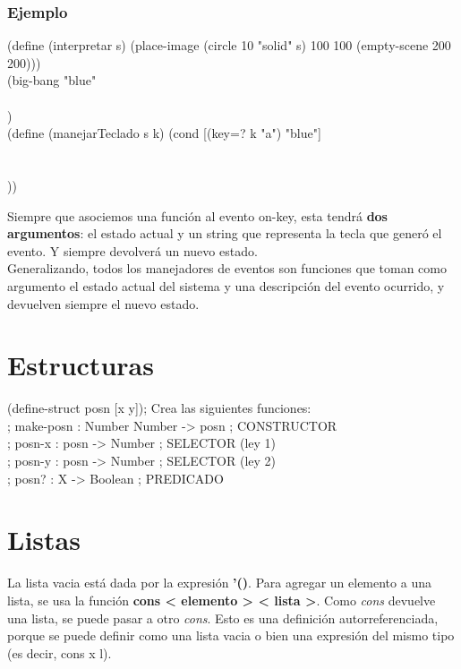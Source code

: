 \documentclass[11pt,a4paper]{article}
\begin{document}
\subsubsection{Ejemplo}
\begin{siderules}
(define (interpretar s) (place-image (circle 10 "solid" s) 100 100 (empty-scene 200 200)))\\

\noindent (big-bang "blue"\\
\indent \indent {}\\
\indent \indent {})\\

\noindent (define (manejarTeclado s k) (cond [(key=? k "a") "blue"]\\
\indent \indent \indent \indent \indent \indent \indent \indent \indent \indent [(key=? k "r") "red"]\\
\indent \indent \indent \indent \indent \indent \indent \indent \indent \indent [(key=? k "v") "green"]\\
\indent \indent \indent \indent \indent \indent \indent \indent \indent \indent [else s]))
\end{siderules}

Siempre que asociemos una función al evento on-key, esta tendrá \textbf{dos argumentos}: el estado actual y un string que representa la tecla que generó el evento. Y siempre devolverá un nuevo estado. \\
\indent Generalizando, todos los manejadores de eventos son funciones que toman como argumento el estado actual del sistema y una descripción del evento ocurrido, y devuelven siempre el nuevo estado.

\section{Estructuras}
\begin{siderules}
(define-struct posn [x y]); Crea las siguientes funciones:\\
; make-posn : Number Number -> posn ; CONSTRUCTOR\\
; posn-x : posn -> Number ; SELECTOR (ley 1)\\
; posn-y : posn -> Number ; SELECTOR (ley 2)\\
; posn? : X -> Boolean ; PREDICADO
\end{siderules}

\section{Listas}
La lista vacia est\'a dada por la expresi\'on \textbf{'()}. Para agregar un elemento a una lista, se usa la funci\'on \textbf{cons < elemento > < lista >}. Como \textit{cons} devuelve una lista, se puede pasar a otro \textit{cons}. Esto es una definici\'on autorreferenciada, porque se puede definir como una lista vacia o bien una expresi\'on del mismo tipo (es decir, cons x l).
\newpage
\end{document}
